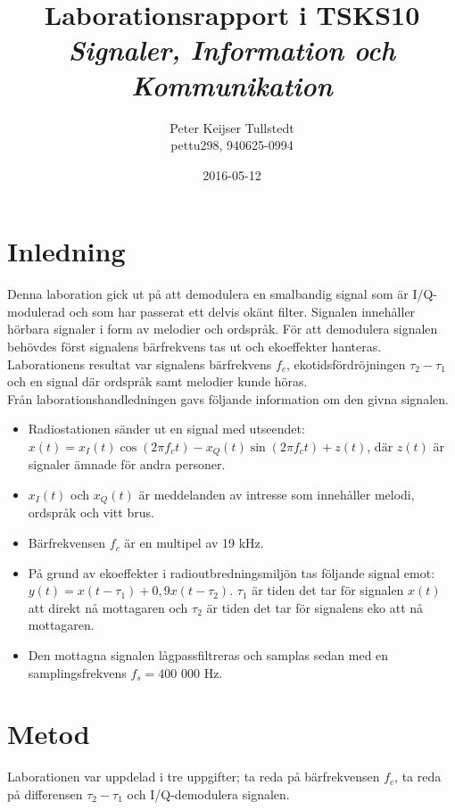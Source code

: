 \documentclass[10pt,twocolumn]{article}
\title{Laborationsrapport i TSKS10 \emph{Signaler, Information och Kommunikation}}
\author{Peter Keijser Tullstedt \\ pettu298, 940625-0994}
\date{2016-05-12}
\begin{document}
\maketitle

\section{Inledning}

Denna laboration gick ut på att demodulera en smalbandig signal som är I/Q-modulerad
och som har passerat ett delvis okänt filter. Signalen innehåller hörbara signaler i form av 
melodier och ordspråk. För att demodulera signalen behövdes först signalens bärfrekvens tas ut och ekoeffekter hanteras. Laborationens resultat var signalens bärfrekvens $f_c$, ekotidsfördröjningen $\tau_2 - \tau_1$ och en
signal där ordspråk samt melodier kunde höras.\\

Från laborationshandledningen gavs följande information om den givna signalen.
\begin{itemize}

	\item Radiostationen sänder ut en signal med utseendet:
		$x(t) = x_I(t)\cos(2\pi f_c t)-x_Q(t)\sin(2\pi f_c t)+z(t)$,
		där $z(t)$ är signaler ämnade för andra personer.

	\item $x_I(t)$ och $x_Q(t)$ är meddelanden av intresse som innehåller melodi, ordspråk och vitt brus.

	\item Bärfrekvensen $f_c$ är en multipel av 19 kHz.

	\item På grund av ekoeffekter i radioutbredningsmiljön tas följande signal emot:
		$y(t)=x(t - \tau_1)+0,9x(t - \tau_2)$.
	$\tau_1$ är tiden det tar för signalen $x(t)$ att direkt nå mottagaren och $\tau_2$ är tiden det tar för signalens eko att nå mottagaren.

	\item Den mottagna signalen lågpassfiltreras och samplas sedan med en samplingsfrekvens $f_s =400 $ 000 Hz.
	
\end{itemize}


\section{Metod}

Laborationen var uppdelad i tre uppgifter; ta reda på bärfrekvensen $f_c$, ta reda på differensen $\tau_2 - \tau_1$ och I/Q-demodulera signalen.
\end{document}
